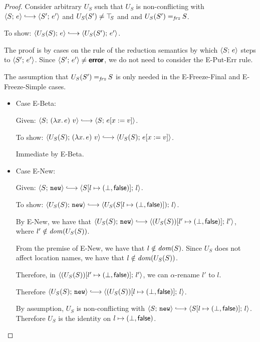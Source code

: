 \begin{proof}
  Consider arbitrary $U_S$ such that $U_S$ is non-conflicting with
  $\config{S}{e} \parstepsto \config{S'}{e'}$ and $U_S(S') \neq \top\hspace{-0.85mm}_{S}$
  and and $U_S(S') =_{\textit{frz}} S$.

  To show: $\config{U_S(S)}{e} \parstepsto \config{U_S(S')}{e'}$.

  The proof is by cases on the rule of the reduction semantics by
  which $\langle S;\, e \rangle$ steps to $\langle S';\, e' \rangle$.  Since
  $\langle S';\, e' \rangle \neq \textbf{\textsf{error}}$, we do not need to consider the {\sc
    E-Put-Err} rule.

  The assumption that $U_S(S') =_{\textit{frz}} S$ is only needed in the {\sc
    E-Freeze-Final} and {\sc E-Freeze-Simple} cases.

  \begin{itemize}

    \item Case {\sc E-Beta}:

      Given: $\config{S}{\app{(\lam{x}{e})}{v}} \parstepsto
      \config{S}{\subst{e}{x}{v}}$.

      To show: $\config{U_S(S)}{\app{(\lam{x}{e})}{v}} \parstepsto
      \config{U_S(S)}{\subst{e}{x}{v}}$.

      Immediate by {\sc E-Beta}.

    \item Case {\sc E-New}:

      Given: $\config{S}{\NEW} \parstepsto
      \config{\extS{S}{l}{\bot}{\frozenfalse}}{l}$.

      To show: $\config{U_S(S)}{\NEW} \parstepsto
      \config{U_S(\extS{S}{l}{\bot}{\frozenfalse})}{l}$.

      By {\sc E-New}, we have that $\config{U_S(S)}{\NEW} \parstepsto
      \config{\extS{(U_S(S))}{l'}{\bot}{\frozenfalse}}{l'}$, where $l'
      \notin \mathit{dom}(U_S(S))$.

      From the premise of {\sc E-New}, we have that $l \notin
      \mathit{dom}(S)$.  Since $U_S$ does not affect location names, we have
      that $l \notin \mathit{dom}(U_S(S))$.

      Therefore, in
      $\langle (U_S(S))[l' \mapsto (\bot, \textsf{false})];\, l' \rangle$, we
      can $\alpha$-rename $l'$ to $l$.

      Therefore $\config{U_S(S)}{\NEW} \parstepsto
      \config{\extS{(U_S(S))}{l}{\bot}{\frozenfalse}}{l}$.

      By assumption, $U_S$ is non-conflicting with $\config{S}{\NEW}
      \parstepsto \config{\extS{S}{l}{\bot}{\frozenfalse}}{l}$.
      Therefore $U_S$ is the identity on
      $l \mapsto (\bot, \textsf{false})$.


\end{itemize}
\end{proof}
